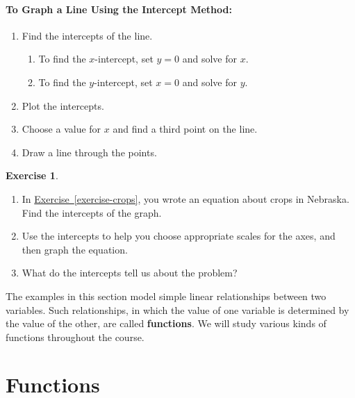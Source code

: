 \documentclass[10pt,]{book}
\newcommand{\terminology}[1]{\textbf{#1}}
\theoremstyle{plain}
\theoremstyle{definition}
\newtheorem{exercise}[theorem]{Exercise}
\theoremstyle{definition}
\numberwithin{equation}{section}
\begin{document}
\paragraph[To Graph a Line Using the Intercept Method:]{To Graph a Line Using the Intercept Method:}\label{paragraphs-4}
\leavevmode%
\begin{enumerate}[label=*\arabic**]
\item\hypertarget{li-64}{}Find the intercepts of the line.%
\begin{enumerate}[label=++\alph*]
\item\hypertarget{li-65}{}To find the \(x\)-intercept, set \(y=0\) and solve for \(x\).%
\item\hypertarget{li-66}{}To find the \(y\)-intercept, set \(x = 0\) and solve for \(y\).%
\end{enumerate}
\item\hypertarget{li-67}{}Plot the intercepts.%
\item\hypertarget{li-68}{}Choose a value for \(x\) and find a third point on the line.%
\item\hypertarget{li-69}{}Draw a line through the points.%
\end{enumerate}
\begin{exercise}\label{exercise-intercepts}
\leavevmode%
\begin{enumerate}[label=*\alph**]
\item\hypertarget{li-70}{}In \hyperref[exercise-crops]{Exercise~\ref{exercise-crops}}, you wrote an equation about crops in Nebraska. Find the intercepts of the graph.%
\item\hypertarget{li-71}{}Use the intercepts to help you choose appropriate scales for the axes, and then graph the equation.%
\item\hypertarget{li-72}{}What do the intercepts tell us about the problem?%
\end{enumerate}
\end{exercise}
\par
The examples in this section model simple linear relationships between two variables.
Such relationships, in which the value of one variable is determined by the value of the
other, are called \terminology{functions}. We will study various kinds of functions throughout the course.%
\typeout{************************************************}
\typeout{************************************************}
\section[Functions]{Functions}\label{functions}
\typeout{************************************************}
\typeout{************************************************}
\end{document}
